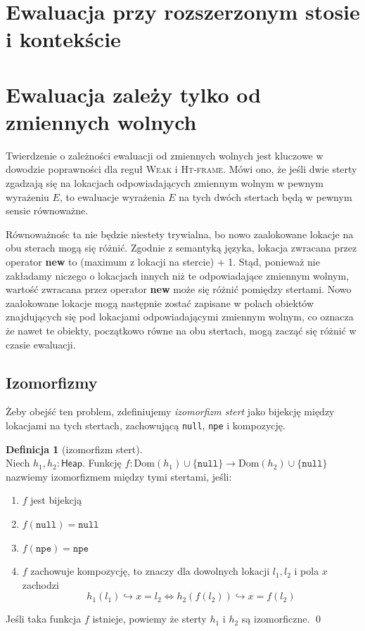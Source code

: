 \documentclass[]{pracamgr}
\renewcommand \| {\hspace{0.75em} | \hspace{0.75em} }
\renewcommand \[ {[\![}
\renewcommand \] {]\!]}
\theoremstyle{definition}
\newtheorem{definition}{Definicja}[section]
\begin{document}
\section{Ewaluacja przy rozszerzonym stosie i kontekście}

\section{Ewaluacja zależy tylko od zmiennych wolnych}
Twierdzenie o zależności ewaluacji od zmiennych wolnych jest kluczowe w dowodzie poprawności dla
reguł \textsc{Weak} i \textsc{Ht-frame}.
Mówi ono, że jeśli dwie sterty zgadzają się na lokacjach odpowiadających zmiennym wolnym w pewnym wyrażeniu $E$,
to ewaluacje wyrażenia $E$ na tych dwóch stertach będą w pewnym sensie równoważne.

Równoważnośc ta nie będzie niestety trywialna, bo nowo zaalokowane lokacje na obu sterach mogą się różnić.
Zgodnie z semantyką języka, lokacja zwracana przez operator \textbf{new} to (maximum z lokacji na stercie) + 1.
Stąd, ponieważ nie zakładamy niczego o lokacjach innych niż te odpowiadające zmiennym wolnym,
wartość zwracana przez operator \textbf{new} może się różnić pomiędzy stertami.
Nowo zaalokowane lokacje mogą następnie zostać zapisane w polach obiektów znajdujących się pod lokacjami
odpowiadającymi zmiennym wolnym, co oznacza że nawet te obiekty, początkowo równe na obu stertach,
mogą zacząć się różnić w czasie ewaluacji.

\subsection{Izomorfizmy}

Żeby obejść ten problem, zdefiniujemy \textit{izomorfizm stert} jako bijekcję między lokacjami
na tych stertach,
zachowującą \texttt{null}, \texttt{npe} i kompozycję.

\begin{definition}[izomorfizm stert] {\ } \\
Niech $h_1, h_2 : \mathsf{Heap}$.
Funkcję $f : \mathrm{Dom}(h_1) \cup \{\mathtt{null}\} \to \mathrm{Dom}(h_2) \cup \{\mathtt{null}\}$
nazwiemy izomorfizmem między tymi stertami, jeśli:
\begin{enumerate}
 \item $f$ jest bijekcją
 \item $f(\mathtt{null}) = \mathtt{null}$
 \item $f(\mathtt{npe}) = \mathtt{npe}$
 \item $f$ zachowuje kompozycję, to znaczy dla dowolnych lokacji $l_1, l_2$ i pola $x$ zachodzi
    $$h_1(l_1) \hookrightarrow x = l_2 \iff h_2(f(l_2)) \hookrightarrow x = f(l_2)$$
\end{enumerate}
Jeśli taka funkcja $f$ istnieje, powiemy że sterty $h_1$ i $h_2$ są izomorficzne.
\qed
\end{definition}
\end{document}
